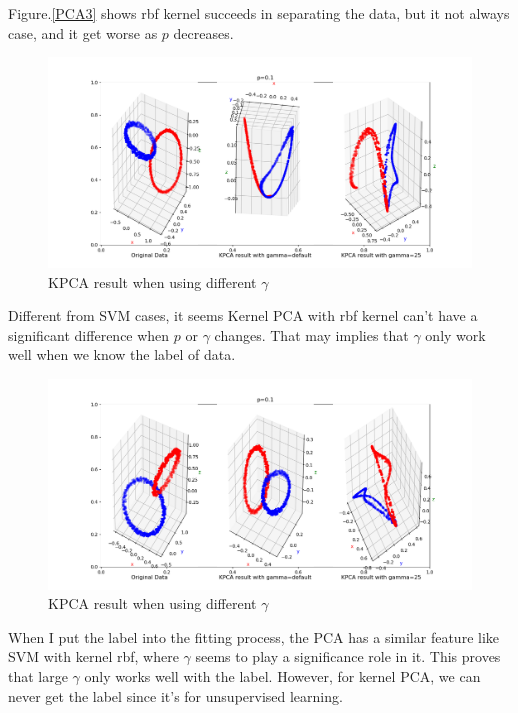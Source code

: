 \documentclass{article}
\begin{document}
Figure.\ref{PCA3} shows rbf kernel succeeds in separating the data, but it not always case, and it get worse as $p$ decreases.
\begin{figure}[H]
    \centering
    \includegraphics[scale=0.4]{PCA5.png}
    \caption{KPCA result when using different $\gamma$}
    \label{PCA5}
\end{figure}
Different from SVM cases, it seems Kernel PCA with rbf kernel can't have a significant difference when $p$ or $\gamma$ changes. That may implies that $\gamma$ only work well when we know the label of data.  
\begin{figure}[H]
    \centering
    \includegraphics[scale=0.4]{PCA7.png}
    \caption{KPCA result when using different $\gamma$}
    \label{PCA7}
\end{figure}
When I put the label into the fitting process, the PCA has a similar feature like SVM with kernel rbf, where $\gamma$ seems to play a significance role in it. This proves that large $\gamma$ only works well with the label. However, for kernel PCA, we can never get the label since it's for unsupervised learning.
\end{document}
